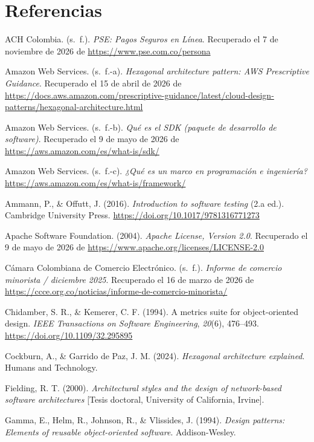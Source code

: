 \section{Referencias}

\begingroup\sloppy
\setlength{\parindent}{-1.5em}
\setlength{\leftskip}{1.5em}
\setlength{\parskip}{0.6em}

\noindent ACH Colombia. (s.~f.). \textit{PSE: Pagos Seguros en Línea}. Recuperado el 7 de noviembre de 2026 de \url{https://www.pse.com.co/persona}

\noindent Amazon Web Services. (s.~f.-a). \textit{Hexagonal architecture pattern: AWS Prescriptive Guidance}. Recuperado el 15 de abril de 2026 de \url{https://docs.aws.amazon.com/prescriptive-guidance/latest/cloud-design-patterns/hexagonal-architecture.html}

\noindent Amazon Web Services. (s.~f.-b). \textit{Qué es el SDK (paquete de desarrollo de software)}. Recuperado el 9 de mayo de 2026 de \url{https://aws.amazon.com/es/what-is/sdk/}

\noindent Amazon Web Services. (s.~f.-c). \textit{¿Qué es un marco en programación e ingeniería?} \url{https://aws.amazon.com/es/what-is/framework/}

\noindent Ammann, P., \& Offutt, J. (2016). \textit{Introduction to software testing} (2.a ed.). Cambridge University Press. \url{https://doi.org/10.1017/9781316771273}

\noindent Apache Software Foundation. (2004). \textit{Apache License, Version 2.0}. Recuperado el 9 de mayo de 2026 de \url{https://www.apache.org/licenses/LICENSE-2.0}

\noindent Cámara Colombiana de Comercio Electrónico. (s.~f.). \textit{Informe de comercio minorista / diciembre 2025}. Recuperado el 16 de marzo de 2026 de \url{https://ccce.org.co/noticias/informe-de-comercio-minorista/}

\noindent Chidamber, S. R., \& Kemerer, C. F. (1994). A metrics suite for object-oriented design. \textit{IEEE Transactions on Software Engineering}, \textit{20}(6), 476--493. \url{https://doi.org/10.1109/32.295895}

\noindent Cockburn, A., \& Garrido de Paz, J. M. (2024). \textit{Hexagonal architecture explained}. Humans and Technology.

\noindent Fielding, R. T. (2000). \textit{Architectural styles and the design of network-based software architectures} [Tesis doctoral, University of California, Irvine].

\noindent Gamma, E., Helm, R., Johnson, R., \& Vlissides, J. (1994). \textit{Design patterns: Elements of reusable object-oriented software}. Addison-Wesley.

